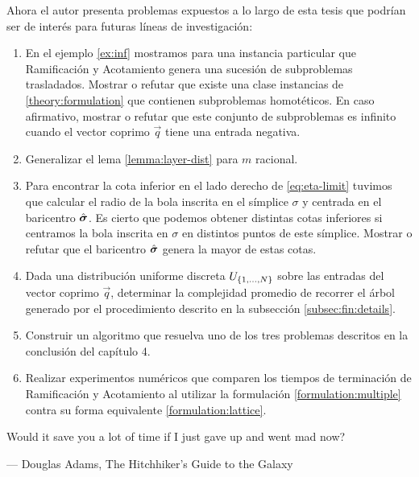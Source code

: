 Ahora el autor presenta problemas expuestos a lo largo de esta tesis que podrían ser de interés para
futuras líneas de investigación:
\begin{enumerate}
	\item En el ejemplo \ref{ex:inf} mostramos para una instancia particular que Ramificación y
		Acotamiento genera una sucesión de subproblemas trasladados. Mostrar o refutar que existe
		una clase instancias de \eqref{theory:formulation} que contienen subproblemas homotéticos.
		En caso afirmativo, mostrar o refutar que este conjunto de subproblemas es infinito cuando
		el vector coprimo $\vec{q}$ tiene una entrada negativa.
	\item Generalizar el lema \ref{lemma:layer-dist} para $m$ racional.
	\item Para encontrar la cota inferior en el lado derecho de \eqref{eq:eta-limit} tuvimos que calcular el
		radio de la bola inscrita en el símplice $\sigma$ y centrada en el baricentro $\hat{\boldsymbol{ \sigma }}$.
		Es cierto que podemos obtener distintas cotas inferiores si centramos la bola inscrita en
		$\sigma$ en distintos puntos de este símplice. Mostrar o refutar que el baricentro
		$\hat{\boldsymbol{ \sigma }}$ genera la mayor de estas cotas.
	\item Dada una distribución uniforme discreta $U_{\lbrace 1, \ldots, N \rbrace}$ sobre las entradas del
		vector coprimo $\vec{q}$, determinar la complejidad promedio de recorrer el árbol generado
		por el procedimiento descrito en la subsección \ref{subsec:fin:details}.
	\item Construir un algoritmo que resuelva uno de los tres problemas descritos en la conclusión del capítulo
		4.
	\item Realizar experimentos numéricos que comparen los tiempos de terminación de Ramificación y
		Acotamiento al utilizar la formulación \eqref{formulation:multiple} contra su forma
		equivalente \eqref{formulation:lattice}.
\end{enumerate}

\begin{flushright}
	\epigraph{Would it save you a lot of time if I just gave up and went mad now?}{--- Douglas Adams, The Hitchhiker's Guide to the Galaxy}
\end{flushright}

